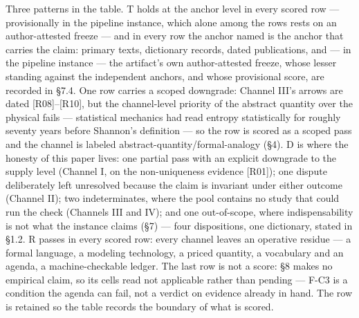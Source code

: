 \documentclass[11pt,a4paper]{article}
\begin{document}
Three patterns in the table. T holds at the anchor level in every scored row — provisionally in the pipeline instance, which alone among the rows rests on an author-attested freeze — and in every row the anchor named is the anchor that carries the claim: primary texts, dictionary records, dated publications, and — in the pipeline instance — the artifact's own author-attested freeze, whose lesser standing against the independent anchors, and whose provisional score, are recorded in §7.4. One row carries a scoped downgrade: Channel III's arrows are dated [R08]–[R10], but the channel-level priority of the abstract quantity over the physical fails — statistical mechanics had read entropy statistically for roughly seventy years before Shannon's definition — so the row is scored as a scoped pass and the channel is labeled abstract-quantity/formal-analogy (§4). D is where the honesty of this paper lives: one partial pass with an explicit downgrade to the supply level (Channel I, on the non-uniqueness evidence [R01]); one dispute deliberately left unresolved because the claim is invariant under either outcome (Channel II); two indeterminates, where the pool contains no study that could run the check (Channels III and IV); and one out-of-scope, where indispensability is not what the instance claims (§7) — four dispositions, one dictionary, stated in §1.2. R passes in every scored row: every channel leaves an operative residue — a formal language, a modeling technology, a priced quantity, a vocabulary and an agenda, a machine-checkable ledger. The last row is not a score: §8 makes no empirical claim, so its cells read not applicable rather than pending — F-C3 is a condition the agenda can fail, not a verdict on evidence already in hand. The row is retained so the table records the boundary of what is scored.
\end{document}
